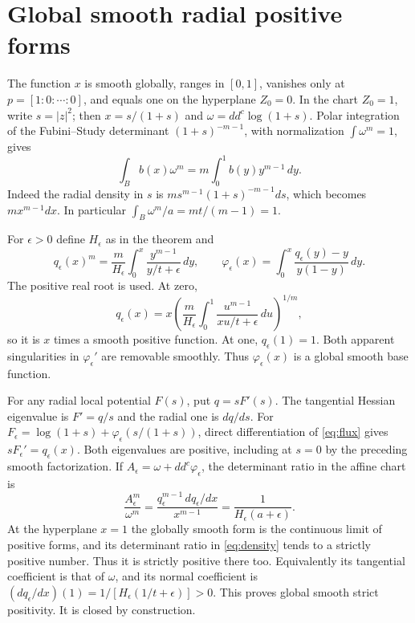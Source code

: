 \documentclass[11pt]{article}
\newcommand{\ddc}{dd^c}
\theoremstyle{remark}\newtheorem{remark}[theorem]{Remark}
\begin{document}
\section{Global smooth radial positive forms}
The function $x$ is smooth globally, ranges in $[0,1]$, vanishes only at
$p=[1:0:\cdots:0]$, and equals one on the hyperplane $Z_0=0$.
In the chart $Z_0=1$, write $s=|z|^2$; then $x=s/(1+s)$ and
$\omega=\ddc\log(1+s)$.
Polar integration of the Fubini--Study determinant $(1+s)^{-m-1}$,
with normalization $\int\omega^m=1$, gives
\begin{equation}\label{eq:radial}
 \int_B b(x)\omega^m=m\int_0^1 b(y)y^{m-1}\,dy.
\end{equation}
Indeed the radial density in $s$ is
$m s^{m-1}(1+s)^{-m-1}ds$, which becomes $m x^{m-1}dx$.
In particular $\int_B\omega^m/a=mt/(m-1)=1$.

For $\epsilon>0$ define $H_\epsilon$ as in the theorem and
\begin{equation}\label{eq:flux}
 q_\epsilon(x)^m=\frac{m}{H_\epsilon}
 \int_0^x\frac{y^{m-1}}{y/t+\epsilon}\,dy,
 \qquad
 \varphi_\epsilon(x)=\int_0^x
 \frac{q_\epsilon(y)-y}{y(1-y)}\,dy.
\end{equation}
The positive real root is used. At zero,
\[
 q_\epsilon(x)=x\left(\frac{m}{H_\epsilon}
 \int_0^1\frac{u^{m-1}}{xu/t+\epsilon}\,du\right)^{1/m},
\]
so it is $x$ times a smooth positive function. At one,
$q_\epsilon(1)=1$. Both apparent singularities in
$\varphi_\epsilon'$ are removable smoothly. Thus
$\varphi_\epsilon(x)$ is a global smooth base function.

For any radial local potential $F(s)$, put $q=sF'(s)$.
The tangential Hessian eigenvalue is $F'=q/s$ and the radial one is $dq/ds$.
For $F_\epsilon=\log(1+s)+\varphi_\epsilon(s/(1+s))$, direct
differentiation of \eqref{eq:flux} gives $sF_\epsilon'=q_\epsilon(x)$.
Both eigenvalues are positive, including at $s=0$ by the preceding smooth
factorization. If $A_\epsilon=\omega+\ddc\varphi_\epsilon$, the determinant
ratio in the affine chart is
\begin{equation}\label{eq:density}
 \frac{A_\epsilon^m}{\omega^m}
 =\frac{q_\epsilon^{m-1}\,dq_\epsilon/dx}{x^{m-1}}
 =\frac1{H_\epsilon(a+\epsilon)}.
\end{equation}
At the hyperplane $x=1$ the globally smooth form is the continuous limit
of positive forms, and its determinant ratio in \eqref{eq:density} tends
to a strictly positive number. Thus it is strictly positive there too.
Equivalently its tangential coefficient is that of $\omega$, and its normal
coefficient is $(dq_\epsilon/dx)(1)=1/[H_\epsilon(1/t+\epsilon)]>0$.
This proves global smooth strict positivity. It is closed by construction.
\end{document}
